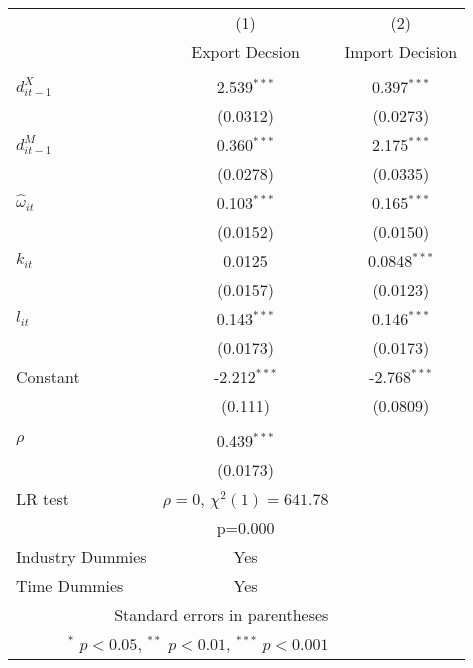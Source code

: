\begin{center}
\begin{tabular}{l*{2}{c}}
\hline\hline
            &\multicolumn{1}{c}{(1)}&\multicolumn{1}{c}{(2)}\\
            &\multicolumn{1}{c}{Export
              Decsion}&\multicolumn{1}{c}{Import Decision}\\
\hline\\
$d_{it-1}^{X}$   &       2.539$^{***}$   &       0.397$^{***}$\\
            &        (0.0312)            &    (0.0273)         \\
[1em]                                                          
$d_{it-1}^{M}$   &       0.360$^{***}$   &       2.175$^{***}$\\
            &        (0.0278)            &    (0.0335)         \\
[1em]                                                          
$\hat{\omega}_{it}$&       0.103$^{***}$   &       0.165$^{***}$\\
            &        (0.0152)            &    (0.0150)         \\
[1em]                                                          
$k_{it}$       &       0.0125            &      0.0848$^{***}$\\
            &        (0.0157)            &    (0.0123)         \\
[1em]                                                          
$l_{it}$     &          0.143$^{***}$   &       0.146$^{***}$\\
            &        (0.0173)            &    (0.0173)         \\
[1em]                                                          
Constant      &        -2.212$^{***}$   &      -2.768$^{***}$\\
            &         (0.111)            &    (0.0809)         \\
\hline
\hline
      &                     \\
$\rho$      &       0.439$^{***}$\\
            &    (0.0173)         \\
LR test& $\rho=0$, $\chi^{2}(1)= 641.78$&\\
& p=0.000&\\
Industry Dummies & Yes& \\
Time Dummies& Yes& \\
\hline\hline
\multicolumn{2}{r}{\footnotesize Standard errors in parentheses}\\
\multicolumn{2}{r}{\footnotesize $^{*}$ \(p<0.05\), $^{**}$ \(p<0.01\), $^{***}$ \(p<0.001\)}\\
\end{tabular}
\end{center}
